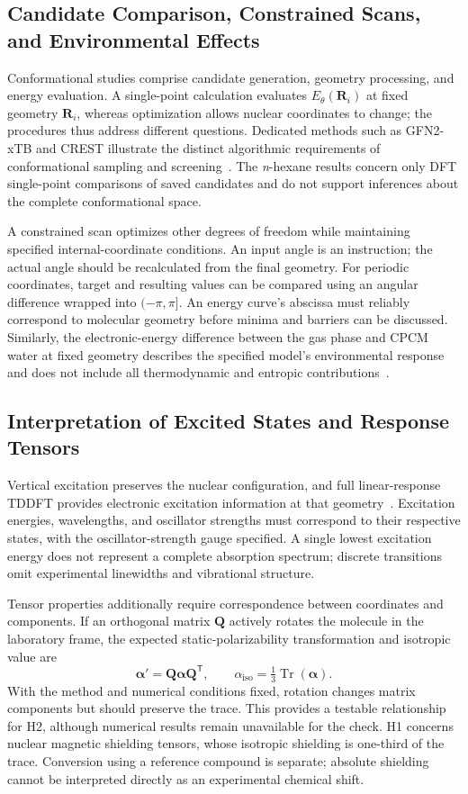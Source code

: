 \documentclass[a4paper,11pt]{article}
\begin{document}
\subsection{Candidate Comparison, Constrained Scans, and Environmental Effects}
Conformational studies comprise candidate generation, geometry processing, and energy evaluation.
A single-point calculation evaluates $E_{\theta}(\mathbf R_i)$ at fixed geometry $\mathbf R_i$, whereas optimization allows nuclear coordinates to change; the procedures thus address different questions.
Dedicated methods such as GFN2-xTB and CREST illustrate the distinct algorithmic requirements of conformational sampling and screening~\cite{gfn2,crest}.
The \textit{n}-hexane results concern only DFT single-point comparisons of saved candidates and do not support inferences about the complete conformational space.

A constrained scan optimizes other degrees of freedom while maintaining specified internal-coordinate conditions.
An input angle is an instruction; the actual angle should be recalculated from the final geometry.
For periodic coordinates, target and resulting values can be compared using an angular difference wrapped into $(-\pi,\pi]$.
An energy curve's abscissa must reliably correspond to molecular geometry before minima and barriers can be discussed.
Similarly, the electronic-energy difference between the gas phase and CPCM water at fixed geometry describes the specified model's environmental response and does not include all thermodynamic and entropic contributions~\cite{cpcm}.

\subsection{Interpretation of Excited States and Response Tensors}
Vertical excitation preserves the nuclear configuration, and full linear-response TDDFT provides electronic excitation information at that geometry~\cite{tddft}.
Excitation energies, wavelengths, and oscillator strengths must correspond to their respective states, with the oscillator-strength gauge specified.
A single lowest excitation energy does not represent a complete absorption spectrum; discrete transitions omit experimental linewidths and vibrational structure.

Tensor properties additionally require correspondence between coordinates and components.
If an orthogonal matrix $\mathbf Q$ actively rotates the molecule in the laboratory frame, the expected static-polarizability transformation and isotropic value are
\begin{equation}
  \boldsymbol\alpha'=\mathbf Q\boldsymbol\alpha\mathbf Q^{\mathsf T},
  \qquad \alpha_{\mathrm{iso}}=\tfrac13\operatorname{Tr}(\boldsymbol\alpha).
  \label{eq:tensor-rotation}
\end{equation}
With the method and numerical conditions fixed, rotation changes matrix components but should preserve the trace.
This provides a testable relationship for H2, although numerical results remain unavailable for the check.
H1 concerns nuclear magnetic shielding tensors, whose isotropic shielding is one-third of the trace.
Conversion using a reference compound is separate; absolute shielding cannot be interpreted directly as an experimental chemical shift.
\end{document}
